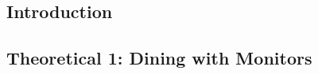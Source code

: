 \documentclass[11pt,a4paper]{article}
\theoremstyle{plain}
\theoremstyle{definition}
\theoremstyle{remark}
\numberwithin{equation}{section}
\begin{document}

\clearpage\maketitle
\thispagestyle{empty}
\clearpage\newpage
\thispagestyle{plain}


\subsection*{Introduction}




\subsection*{Theoretical 1: Dining with Monitors}
\end{document}
